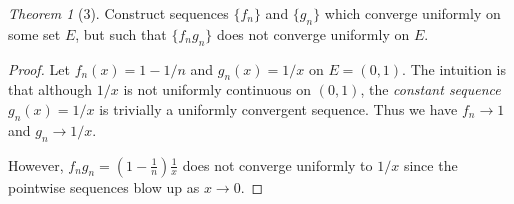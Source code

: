 \documentclass[12pt]{article}
\theoremstyle{remark}
\theoremstyle{named}
\newtheorem*{theorem}{Theorem}
\begin{document}
\begin{theorem}[3]
    Construct sequences \(\{f_n\}\) and \(\{g_n\}\)  which converge uniformly on some set \(E\), but such that \(\{f_n g_n\}\) does not converge uniformly on \(E\). 
\end{theorem}

\begin{proof}
    Let \(f_n(x) = 1 - 1/n\) and \(g_n(x) = 1/x\) on \(E = (0, 1)\). The intuition is that although \(1/x\) is not uniformly continuous on \((0, 1)\), the \textit{constant sequence} \(g_n(x) = 1/x\) is trivially a uniformly convergent sequence. Thus we have \(f_n \to 1\) and \(g_n \to 1/x\).

    However, \(f_n g_n = (1 - \frac{1}{n})\frac{1}{x}\) does not converge uniformly to \(1/x\) since the pointwise sequences blow up as \(x \to 0\).
\end{proof}
\end{document}
